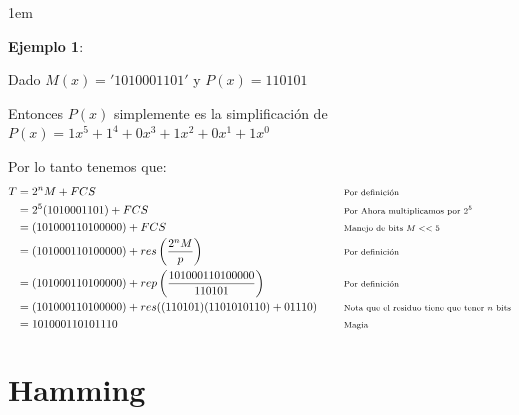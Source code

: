 \documentclass[12pt, fleqn]{report}                             %
\newenvironment{SmallIndentation}[1][0.75em]                    %
        {\begin{adjustwidth}{#1}{}\begin{footnotesize}}             %
        {\end{footnotesize}\end{adjustwidth}}                       %
\DeclareMathOperator \Space {\quad}                             %
\newcommand \Remember[1]{\Space\text{\scriptsize{#1}}}          %
\theoremstyle{break}                                            %
\newcommand{\Wrap}[1]{\left( #1 \right)}                        %
\newcommand{\pfrac}[2]{\Wrap{\dfrac{#1}{#2}}}                   %
\begin{document}
                \begin{SmallIndentation}[1em]
                    \textbf{Ejemplo 1}:
                    
                    Dado $M(x) = '1010001101'$ y $P(x) = 110101$

                    Entonces $P(x)$ simplemente es la simplificación de 
                    $P(x) = 1x^5 + 1^4 + 0x^3 + 1x^2 + 0x^1 + 1x^0$
                    
                    Por lo tanto tenemos que:
                    \begin{align*}
                        T
                            &= 2^n M + FCS
                                &&\Remember{Por definición}                                 \\
                            &= 2^5 (1010001101) + FCS
                                &&\Remember{Por Ahora multiplicamos por $2^5$}              \\
                            &= (101000110100000) + FCS
                                &&\Remember{Manejo de bits $M << 5$}                        \\
                            &= (101000110100000) + res\pfrac{2^n M}{p}
                                &&\Remember{Por definición}                                 \\
                            &= (101000110100000) + rep\pfrac{101000110100000}{110101}
                                &&\Remember{Por definición}                                 \\
                            &= (101000110100000) + res((110101)(1101010110) + 01110)
                                &&\Remember{Nota que el residuo tiene que tener $n$ bits}   \\
                            &= 101000110101110
                                &&\Remember{Magia}
                    \end{align*}
                
                \end{SmallIndentation}

        \clearpage
        \section{Hamming}
\end{document}
